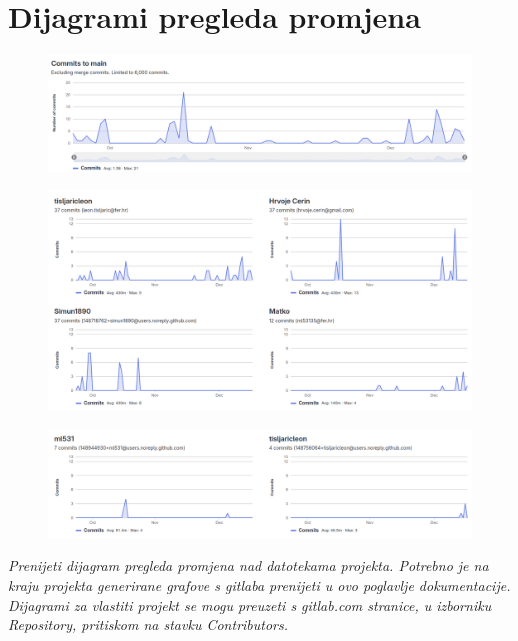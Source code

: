 		\section*{Dijagrami pregleda promjena}
			\begin{figure}
				\includegraphics[width=15cm]{dijagrami/dijagram_pregleda_promjena.png}
			\end{figure}
			\begin{figure}
				\includegraphics[width=15cm]{dijagrami/dijagram_pregleda_promjena2.png}
			\end{figure}
			\begin{figure}
				\includegraphics[width=15cm]{dijagrami/dijagram_pregleda_promjena3.png}
			\end{figure}
			\textit{Prenijeti dijagram pregleda promjena nad datotekama projekta. Potrebno je na kraju projekta generirane grafove s gitlaba prenijeti u ovo poglavlje dokumentacije. Dijagrami za vlastiti projekt se mogu preuzeti s gitlab.com stranice, u izborniku Repository, pritiskom na stavku Contributors.}
		\eject
		
	
